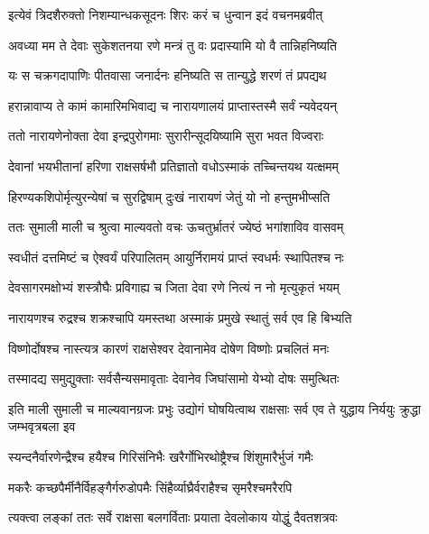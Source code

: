\twolineshloka
{इत्येवं त्रिदशैरुक्तो निशम्यान्धकसूदनः}
{शिरः करं च धुन्वान इदं वचनमब्रवीत्} %

\twolineshloka
{अवध्या मम ते देवाः सुकेशतनया रणे}
{मन्त्रं तु वः प्रदास्यामि यो वै तान्निहनिष्यति} %

\twolineshloka
{यः स चक्रगदापाणिः पीतवासा जनार्दनः}
{हनिष्यति स तान्युद्धे शरणं तं प्रपद्यथ} %

\twolineshloka
{हरान्नावाप्य ते कामं कामारिमभिवाद्य च}
{नारायणालयं प्राप्तास्तस्मै सर्वं न्यवेदयन्} %

\twolineshloka
{ततो नारायणेनोक्ता देवा इन्द्रपुरोगमाः}
{सुरारीन्सूदयिष्यामि सुरा भवत विज्वराः} %

\twolineshloka
{देवानां भयभीतानां हरिणा राक्षसर्षभौ}
{प्रतिज्ञातो वधोऽस्माकं तच्चिन्तयथ यत्क्षमम्} %

\twolineshloka
{हिरण्यकशिपोर्मृत्युरन्येषां च सुरद्विषाम्}
{दुःखं नारायणं जेतुं यो नो हन्तुमभीप्सति} %

\twolineshloka
{ततः सुमाली माली च श्रुत्वा माल्यवतो वचः}
{ऊचतुर्भ्रातरं ज्येष्ठं भगांशाविव वासवम्} %

\twolineshloka
{स्वधीतं दत्तमिष्टं च ऐश्वर्यं परिपालितम्}
{आयुर्निरामयं प्राप्तं स्वधर्मः स्थापितश्च नः} %

\twolineshloka
{देवसागरमक्षोभ्यं शस्त्रौघैः प्रविगाह्य च}
{जिता देवा रणे नित्यं न नो मृत्युकृतं भयम्} %

\twolineshloka
{नारायणश्च रुद्रश्च शक्रश्चापि यमस्तथा}
{अस्माकं प्रमुखे स्थातुं सर्व एव हि बिभ्यति} %

\twolineshloka
{विष्णोर्दोषश्च नास्त्यत्र कारणं राक्षसेश्वर}
{देवानामेव दोषेण विष्णोः प्रचलितं मनः} %

\twolineshloka
{तस्मादद्य समुद्युक्ताः सर्वसैन्यसमावृताः}
{देवानेव जिघांसामो येभ्यो दोषः समुत्थितः} %

\threelineshloka
{इति माली सुमाली च माल्यवानग्रजः प्रभुः}
{उद्योगं घोषयित्वाथ राक्षसाः सर्व एव ते}
{युद्धाय निर्ययुः क्रुद्धा जम्भवृत्रबला इव} %

\twolineshloka
{स्यन्दनैर्वारणेन्द्रैश्च हयैश्च गिरिसंनिभैः}
{खरैर्गोभिरथोष्ट्रैश्च शिंशुमारैर्भुजं गमैः} %

\twolineshloka
{मकरैः कच्छपैर्मीनैर्विहङ्गैर्गरुडोपमैः}
{सिंहैर्व्याघ्रैर्वराहैश्च सृमरैश्चमरैरपि} %

\twolineshloka
{त्यक्त्वा लङ्कां ततः सर्वे राक्षसा बलगर्विताः}
{प्रयाता देवलोकाय योद्धुं दैवतशत्रवः} %


